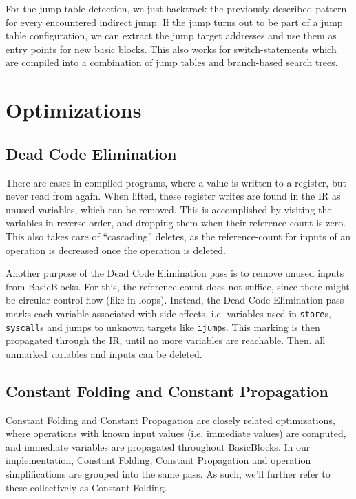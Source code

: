 \documentclass[course=eragp]{aspdoc}
\begin{document}
\par 

For the jump table detection, we just backtrack the previously described pattern for every
encountered indirect jump. If the jump turns out to be part of a jump table configuration, we can
extract the jump target addresses and use them as entry points for new basic blocks. This also works
for switch-statements which are compiled into a combination of jump tables and branch-based search
trees.

\section{Optimizations}
\subsection{Dead Code Elimination}\label{dead_code_elimination}

There are cases in compiled programs, where a value is written to a register, but never read from again.
When lifted, these register writes are found in the IR as unused variables, which can be removed.
This is accomplished by visiting the variables in reverse order, and dropping them when their reference-count is zero.
This also takes care of ``cascading'' deletes, as the reference-count for inputs of an operation is decreased once the
operation is deleted.

Another purpose of the Dead Code Elimination pass is to remove unused inputs from BasicBlocks. For this, the
reference-count does not suffice, since there might be circular control flow (like in loops). Instead, the Dead Code
Elimination pass marks each variable associated with side effects, i.e. variables used in \texttt{store}s,
\texttt{syscall}s and jumps to unknown targets like \texttt{ijump}s. This marking is then propagated through the IR,
until no more variables are reachable. Then, all unmarked variables and inputs can be deleted.

\subsection{Constant Folding and Constant Propagation}\label{constant_folding}

Constant Folding and Constant Propagation are closely related optimizations, where operations with known input values
(i.e. immediate values) are computed, and immediate variables are propagated throughout BasicBlocks.
In our implementation, Constant Folding, Constant Propagation and operation simplifications are grouped into the same
pass.  As such, we'll further refer to these collectively as Constant Folding.
\end{document}
